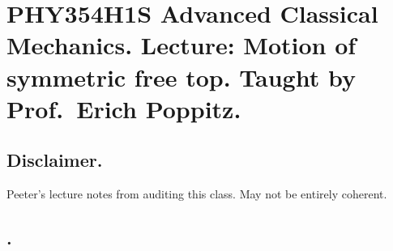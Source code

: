 
%

\chapter{PHY354H1S Advanced Classical Mechanics.  Lecture: Motion of symmetric free top.  Taught by Prof.\ Erich Poppitz.}
\label{chap:symmetricFreeTop}
{}
\date{Mar XX, 2012}

\beginArtWithToc

\section{Disclaimer.}

Peeter's lecture notes from auditing this class.  May not be entirely coherent.

\section{.}

\EndArticle
